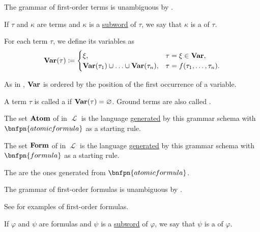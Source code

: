 \begin{definition}
\begin{thmenum}
    The grammar of first-order terms is unambiguous by .

     If \( \tau \) and \( \kappa \) are terms and \( \kappa \) is a \hyperref[def:language/subword]{subword} of \( \tau \), we say that \( \kappa \) is a  of \( \tau \).

     For each term \( \tau \), we define its variables as
    \begin{equation}\label{eq:def:first_order_syntax/term_variables}
      \operatorname{\mathbf{Var}}(\tau) \coloneqq \begin{cases}
        \xi,                                                        &\tau = \xi \in \operatorname{\mathbf{Var}}, \\
        \operatorname{\mathbf{Var}}(\tau_1) \cup \ldots \cup \operatorname{\mathbf{Var}}(\tau_n), &\tau = f(\tau_1, \ldots, \tau_n).
      \end{cases}
    \end{equation}

    As in , \( \operatorname{\mathbf{Var}} \) is ordered by the position of the first occurrence of a variable.

     A term \( \tau \) is called a  if \( \operatorname{\mathbf{Var}}(\tau) = \varnothing \). Ground terms are also called .

     The set \( \operatorname{\mathbf{Atom}} \) of  in \( \mscrL \) is the language \hyperref[def:grammar_derivation/grammar_language]{generated} by this grammar schema with \( \bnfpn{atomic formula} \) as a starting rule.

     The set \( \operatorname{\mathbf{Form}} \) of  in \( \mscrL \) is the language \hyperref[def:grammar_derivation/grammar_language]{generated} by this grammar schema with \( \bnfpn{formula} \) as a starting rule.

    The  are the ones generated from \( \bnfpn{atomic formula} \).

    The grammar of first-order formulas is unambiguous by .

    See  for examples of first-order formulas.

     If \( \varphi \) and \( \psi \) are formulas and \( \psi \) is a \hyperref[def:language/subword]{subword} of \( \varphi \), we say that \( \psi \) is a  of \( \varphi \).


\end{thmenum}
\end{definition}

